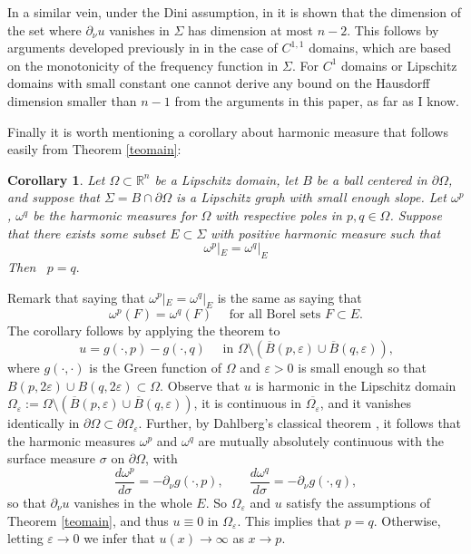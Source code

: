 \documentclass[11pt]{amsart}
\newcommand{\R}{{\mathbb R}}       %
\newcommand{\ve}{{\varepsilon}}
\newtheorem{coro}[theorem]{Corollary}
\theoremstyle{definition}
\theoremstyle{remark}
\numberwithin{equation}{section}
\begin{document}
In a similar vein, under the Dini assumption, in \cite{AE} it is shown that the dimension of the set
where $\partial_\nu u$ vanishes in $\Sigma$ has dimension at most $n-2$. This follows by arguments developed
previously in \cite{Lin} in the case of $C^{1,1}$ domains, which are based on the monotonicity of the 
frequency function in $\Sigma$. For $C^1$ domains or Lipschitz domains with small constant one cannot
derive any bound on the Hausdorff dimension 
smaller than $n-1$ from the arguments in this paper, as far as I know.

Finally it is worth mentioning a corollary about harmonic measure that follows easily from Theorem \ref{teomain}:

\begin{coro}
Let $\Omega\subset\R^n$ be a Lipschitz domain, let $B$ be a ball centered in $\partial\Omega$, and suppose that $\Sigma=B\cap \partial\Omega$
is a Lipschitz graph with small enough slope.
Let $\omega^p$, $\omega^q$ be the harmonic measures for $\Omega$ with respective poles in $p,q\in\Omega$.
Suppose that there exists some subset $E\subset\Sigma$ with positive harmonic measure such that
$$\omega^p|_E = \omega^q|_E$$
Then \,
$p = q.$
\end{coro}

Remark that saying that $\omega^p|_E = \omega^q|_E$ is the same as saying that 
$$\omega^p(F) = \omega^q(F)\quad \mbox{ for all Borel sets $F\subset E$.}$$
 The corollary follows by applying the theorem to 
$$u=  g(\cdot,p) - g(\cdot,q)\quad \mbox{ in $\Omega\setminus (\overline B(p,\ve)\cup \overline B(q,\ve))$,}$$
where $g(\cdot,\cdot)$ is the Green function of $\Omega$ and $\ve>0$ is small enough so that
$B(p,2\ve)\cup B(q,2\ve)\subset \Omega$. Observe that $u$ is harmonic in the Lipschitz domain
$\Omega_\ve:=\Omega\setminus (\overline B(p,\ve)\cup \overline B(q,\ve))$, it is continuous in $\overline{
\Omega_\ve}$, and it vanishes identically in $\partial\Omega \subset \partial\Omega_\ve$. Further, by Dahlberg's classical
theorem \cite{Dah}, it follows that the harmonic measures $\omega^p$ and $\omega^q$ are mutually absolutely 
continuous with the surface measure $\sigma$ on $\partial\Omega$, with 
$$\frac{d\omega^p}{d\sigma} = -\partial_\nu g(\cdot,p),\qquad \frac{d\omega^q}{d\sigma} = -\partial_\nu g(\cdot,q),$$
so that $\partial_\nu u$ vanishes in the whole $E$. So $\Omega_\ve$ and $u$ satisfy the assumptions
of Theorem \ref{teomain}, and thus $u\equiv 0$ in $\Omega_\ve$. This implies that $p=q$. Otherwise, letting $\ve\to 0$ we infer that $u(x)\to\infty$ as $x\to p$.
\end{document}
